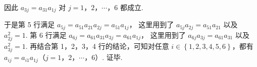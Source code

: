 \begin{solution}
\begin{enumerate}
因此 \( a_{3j}=a_{31}a_{1j} \) 对 \(j=1\)，\(2\)，\(\cdots\)，\(6\) 都成立.

于是第 5 行满足 \( a_{5j}=a_{51}a_{21}a_{2j}=a_{51}a_{1j} \)，
这里用到了 \( a_{5j}a_{2j}=a_{51}a_{21} \) 以及 \( a_{2j}^2=1 \).
第 6 行满足 \( a_{6j}=a_{61}a_{31}a_{3j}=a_{61}a_{1j} \)，
这里用到了 \( a_{6j}a_{3j}=a_{61}a_{31} \) 以及 \( a_{3j}^2=1 \).
再结合第 1，2，3，4 行的结论，可知对任意 \( i\in \left\{ 1,2,3,4,5,6 \right\} \)，都有 \( a_{ij}=a_{i1}a_{1j} \)（\(j=1\)，\(2\)，\(\cdots\)，\(6\)）.
证毕.
\end{enumerate}
\end{solution}
